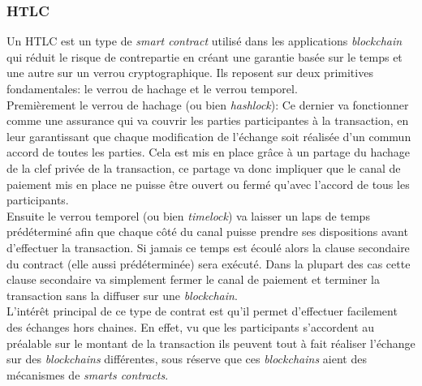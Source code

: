 \subsubsection{HTLC}

Un HTLC est un type de \textit{\gls{smart contract}} utilisé dans les applications \textit{\gls{blockchain}} qui réduit le risque de contrepartie en créant une garantie basée sur le temps et une autre sur un verrou cryptographique\cite{narayanam2022generalized}.
Ils reposent sur deux primitives fondamentales: le verrou de hachage et le verrou temporel.\\
Premièrement le verrou de hachage (ou bien \textit{hashlock}): Ce dernier va fonctionner comme une assurance qui va couvrir les parties participantes à la transaction, en leur garantissant que chaque modification de l'échange soit réalisée d'un commun accord de toutes les parties.
Cela est mis en place grâce à un partage du hachage de la clef privée de la transaction, ce partage va donc impliquer que le canal de paiement mis en place ne puisse être ouvert ou fermé qu'avec l'accord de tous les participants.\\
Ensuite le verrou temporel (ou bien \textit{timelock}) va laisser un laps de temps prédéterminé afin que chaque côté du canal puisse prendre ses dispositions avant d'effectuer la transaction. Si jamais ce temps est écoulé alors la clause secondaire du contract (elle aussi prédéterminée) sera exécuté. 
Dans la plupart des cas cette clause secondaire va simplement fermer le canal de paiement et terminer la transaction sans la diffuser sur une \textit{\gls{blockchain}}.\\
L’intérêt principal de ce type de contrat est qu'il permet d'effectuer facilement des échanges hors chaines. En effet, vu que les participants s'accordent au préalable sur le montant de la transaction ils peuvent tout à fait réaliser l'échange sur des \textit{\gls{blockchain}s} différentes, sous réserve que ces \textit{\gls{blockchain}s} aient des mécanismes de \textit{smarts contracts}.

